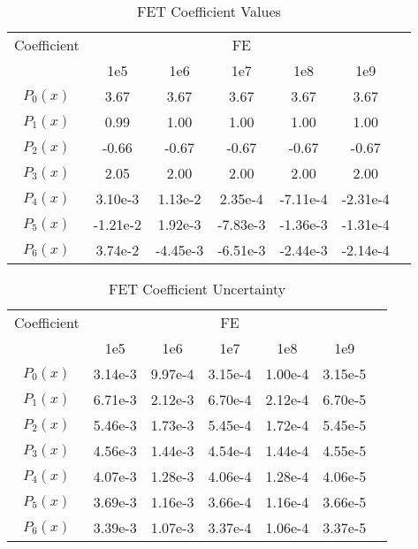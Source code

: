 \documentclass[10tma4paper]{article}
\begin{document}
\begin{table}[htbp!]
	\caption{FET Coefficient Values}
	\centering
	\begin{tabular}{c c c c c c c }
		\hline
		Coefficient & &  & FE  &  & & \\[0.5ex]
		 & 1e5 & 1e6 & 1e7 & 1e8 & 1e9 &\\
		 \hline		
		\hline
		$P_{0}(x)$ & 3.67     & 3.67     & 3.67     & 3.67     & 3.67     & \\
		$P_{1}(x)$ & 0.99     & 1.00     & 1.00     & 1.00     & 1.00     & \\
		$P_{2}(x)$ & -0.66    & -0.67    & -0.67    & -0.67    & -0.67    & \\
		$P_{3}(x)$ & 2.05     & 2.00     & 2.00     & 2.00     & 2.00     & \\
		$P_{4}(x)$ & 3.10e-3  & 1.13e-2  & 2.35e-4  & -7.11e-4 & -2.31e-4 & \\
		$P_{5}(x)$ & -1.21e-2 & 1.92e-3  & -7.83e-3 & -1.36e-3 & -1.31e-4 & \\
		$P_{6}(x)$ & 3.74e-2  & -4.45e-3 & -6.51e-3 & -2.44e-3 & -2.14e-4 & \\ [1ex]
		\hline
	\end{tabular}
	\label{table:coef res}
\end{table}
\begin{table}[htbp!]
	\caption{FET Coefficient Uncertainty}
	\centering
	\begin{tabular}{c c c c c c c }
		\hline
		Coefficient & & & FE & & & \\[0.5ex]
		& 1e5 & 1e6 & 1e7 & 1e8 & 1e9 &\\
		\hline		
		\hline
		$P_{0}(x)$ & 3.14e-3 & 9.97e-4 & 3.15e-4 & 1.00e-4 & 3.15e-5 & \\
		$P_{1}(x)$ & 6.71e-3 & 2.12e-3 & 6.70e-4 & 2.12e-4 & 6.70e-5 & \\
		$P_{2}(x)$ & 5.46e-3 & 1.73e-3 & 5.45e-4 & 1.72e-4 & 5.45e-5 & \\
		$P_{3}(x)$ & 4.56e-3 & 1.44e-3 & 4.54e-4 & 1.44e-4 & 4.55e-5 & \\
		$P_{4}(x)$ & 4.07e-3 & 1.28e-3 & 4.06e-4 & 1.28e-4 & 4.06e-5 & \\
		$P_{5}(x)$ & 3.69e-3 & 1.16e-3 & 3.66e-4 & 1.16e-4 & 3.66e-5 & \\
		$P_{6}(x)$ & 3.39e-3 & 1.07e-3 & 3.37e-4 & 1.06e-4 & 3.37e-5 & \\ [1ex]
		\hline
	\end{tabular}
	\label{table:coef unc res}
\end{table}
\\
\end{document}
